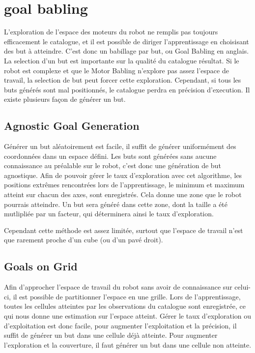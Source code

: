 \documentclass[11pt,french]{report}
\begin{document}
\section{goal babling}

L'exploration de l'espace des moteurs du robot ne remplis pas toujours efficacement le catalogue, et il est possible de diriger l'apprentissage en choisisant des but à atteindre. C'est donc un babillage par but, ou Goal Babling en anglais. La selection d'un but est importante sur la qualité du catalogue résultat. Si le robot est complexe et que le Motor Babling n'explore pas assez l'espace de travail, la selection de but peut forcer cette exploration. Cependant, si tous les buts générés sont mal positionnés, le catalogue perdra en précision d'execution. Il existe plusieurs façon de générer un but.

\subsection{Agnostic Goal Generation}

Générer un but aléatoirement est facile, il suffit de générer uniformément des coordonnées dans un espace défini. Les buts sont générées sans aucune connaissance au préalable sur le robot, c'est donc une génération de but agnostique. Afin de pouvoir gérer le taux d'exploration avec cet algorithme, les positions extrêmes rencontrées lors de l'apprentissage, le minimum et maximum atteint sur chacun des axes, sont enregistrés. Cela donne une zone que le robot pourrais atteindre. Un but sera généré dans cette zone, dont la taille a été mutlipliée par un facteur, qui déterminera ainsi le taux d'exploration.

Cependant cette méthode est assez limitée, surtout que l'espace de travail n'est que rarement proche d'un cube (ou d'un pavé droit).

\subsection{Goals on Grid}

Afin d'approcher l'espace de travail du robot sans avoir de connaissance sur celui-ci, il est possible de partitionner l'espace en une grille. Lors de l'apprentissage, toutes les cellules atteintes par les observations du catalogue sont enregistrée, ce qui nous donne une estimation sur l'espace atteint. Gérer le taux d'exploration ou d'exploitation est donc facile, pour augmenter l'exploitation et la précision, il suffit de générer un but dans une cellule déjà atteinte. Pour augmenter l'exploration et la couverture, il faut générer un but dans une cellule non atteinte. 
\end{document}
